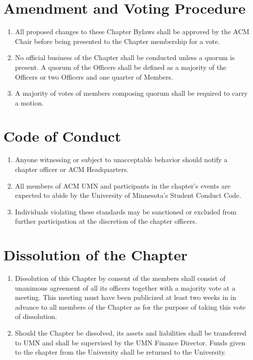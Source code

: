 \section{Amendment and Voting Procedure}
\begin{enumerate}
	\item All proposed changes to these Chapter Bylaws shall be approved by the ACM Chair before being presented to the Chapter membership for a vote.
	\item No official business of the Chapter shall be conducted unless a quorum is present. A quorum of the Officers shall be defined as a majority of the Officers or two Officers and one quarter of Members.
	\item A majority of votes of members composing quorum shall be required to carry a motion.
\end{enumerate}

\section{Code of Conduct}
\begin{enumerate}
	\item Anyone witnessing or subject to unacceptable behavior should notify a chapter officer or ACM Headquarters.
	\item All members of ACM UMN and participants in the chapter’s events are expected to abide by the University of Minnesota’s Student Conduct Code.
	\item Individuals violating these standards may be sanctioned or excluded from further participation at the discretion of the chapter officers.
\end{enumerate}

\section{Dissolution of the Chapter}
\begin{enumerate}
	\item Dissolution of this Chapter by consent of the members shall consist of unanimous agreement of all its officers together with a majority vote at a meeting. This meeting must have been publicized at least two weeks in in advance to all members of the Chapter as for the purpose of taking this vote of dissolution.
	\item Should the Chapter be dissolved, its assets and liabilities shall be transferred to UMN and shall be supervised by the UMN Finance Director.  Funds given to the chapter from the University shall be returned to the University.
\end{enumerate}


